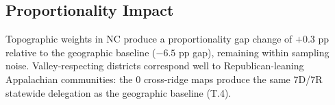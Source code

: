 \subsection{Proportionality Impact}

Topographic weights in NC produce a proportionality gap change of $+0.3$ pp relative to the geographic baseline ($-6.5$ pp gap), remaining within sampling noise. Valley-respecting districts correspond well to Republican-leaning Appalachian communities: the 0 cross-ridge maps produce the same 7D/7R statewide delegation as the geographic baseline (T.4).
